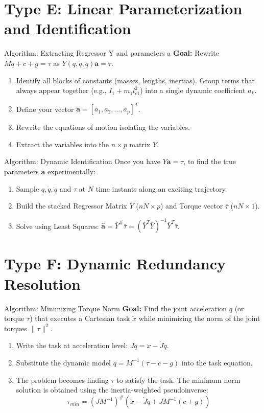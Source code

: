 \documentclass[11pt,a4paper]{article}
\begin{document}
\section{Type E: Linear Parameterization and Identification}

{Algorithm: Extracting Regressor Y and parameters a}
\textbf{Goal:} Rewrite $M\ddot{q} + c + g = \tau$ as $Y(q, \dot{q}, \ddot{q})\mathbf{a} = \tau$.
\begin{enumerate}
    \item Identify all blocks of constants (masses, lengths, inertias). Group terms that always appear together (e.g., $I_1 + m_1 l_{c1}^2$) into a single dynamic coefficient $a_k$.
    \item Define your vector $\mathbf{a} = [a_1, a_2, \dots, a_p]^T$.
    \item Rewrite the equations of motion isolating the variables.
    \item Extract the variables into the $n \times p$ matrix $Y$. 
\end{enumerate}

{Algorithm: Dynamic Identification}
Once you have $Y\mathbf{a} = \tau$, to find the true parameters $\mathbf{a}$ experimentally:
\begin{enumerate}
    \item Sample $q, \dot{q}, \ddot{q}$ and $\tau$ at $N$ time instants along an exciting trajectory.
    \item Build the stacked Regressor Matrix $\bar{Y}$ ($nN \times p$) and Torque vector $\bar{\tau}$ ($nN \times 1$).
    \item Solve using Least Squares: $\hat{\mathbf{a}} = \bar{Y}^\# \bar{\tau} = (\bar{Y}^T \bar{Y})^{-1} \bar{Y}^T \bar{\tau}$.
\end{enumerate}

\section{Type F: Dynamic Redundancy Resolution}

{Algorithm: Minimizing Torque Norm}
\textbf{Goal:} Find the joint acceleration $\ddot{q}$ (or torque $\tau$) that executes a Cartesian task $\ddot{x}$ while minimizing the norm of the joint torques $\|\tau\|^2$.
\begin{enumerate}
    \item Write the task at acceleration level: $J\ddot{q} = \ddot{x} - \dot{J}\dot{q}$.
    \item Substitute the dynamic model $\ddot{q} = M^{-1}(\tau - c - g)$ into the task equation.
    \item The problem becomes finding $\tau$ to satisfy the task. The minimum norm solution is obtained using the inertia-weighted pseudoinverse:
    \begin{equation}
        \tau_{min} = (J M^{-1})^\# (\ddot{x} - \dot{J}\dot{q} + J M^{-1}(c + g))
    \end{equation}
\end{enumerate}
\end{document}
